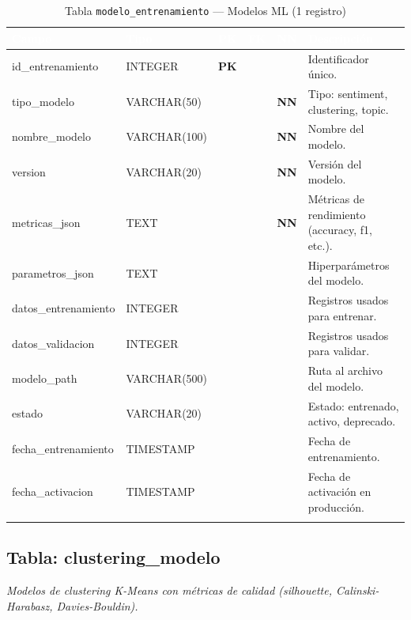 \documentclass[11pt,a4paper]{article}
\newcommand{\tableheadrow}{\rowcolor{tableheader}}
\newcommand{\tablehead}[1]{\textcolor{white}{\textbf{#1}}}
\newcommand{\pk}{\textcolor{emiblue}{\textbf{PK}}}
\newcommand{\nn}{\textcolor{red!70!black}{\textbf{NN}}}
\begin{document}
\begin{longtable}{p{4.2cm} p{2.8cm} c c c p{4.5cm}}
\toprule
\tableheadrow
\tablehead{Campo} & \tablehead{Tipo} & \tablehead{PK} & \tablehead{FK} & \tablehead{NN} & \tablehead{Descripción} \\
\midrule
\endhead
id\_entrenamiento & INTEGER & \pk & & & Identificador único. \\
\rowcolor{tablerow}
tipo\_modelo & VARCHAR(50) & & & \nn & Tipo: sentiment, clustering, topic. \\
nombre\_modelo & VARCHAR(100) & & & \nn & Nombre del modelo. \\
\rowcolor{tablerow}
version & VARCHAR(20) & & & \nn & Versión del modelo. \\
metricas\_json & TEXT & & & \nn & Métricas de rendimiento (accuracy, f1, etc.). \\
\rowcolor{tablerow}
parametros\_json & TEXT & & & & Hiperparámetros del modelo. \\
datos\_entrenamiento & INTEGER & & & & Registros usados para entrenar. \\
\rowcolor{tablerow}
datos\_validacion & INTEGER & & & & Registros usados para validar. \\
modelo\_path & VARCHAR(500) & & & & Ruta al archivo del modelo. \\
\rowcolor{tablerow}
estado & VARCHAR(20) & & & & Estado: entrenado, activo, deprecado. \\
fecha\_entrenamiento & TIMESTAMP & & & & Fecha de entrenamiento. \\
\rowcolor{tablerow}
fecha\_activacion & TIMESTAMP & & & & Fecha de activación en producción. \\
\bottomrule
\caption{Tabla \texttt{modelo\_entrenamiento} — Modelos ML (1 registro)}
\end{longtable}

\subsection{Tabla: clustering\_modelo}
\textit{Modelos de clustering K-Means con métricas de calidad (silhouette, Calinski-Harabasz, Davies-Bouldin).}
\end{document}
